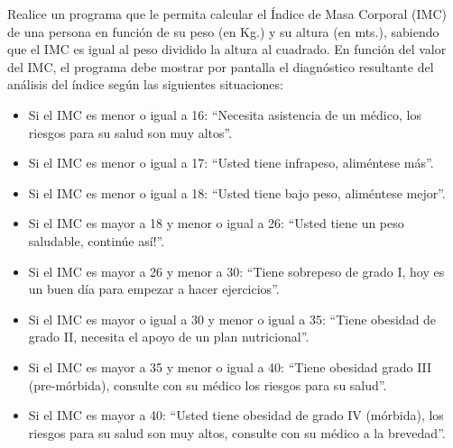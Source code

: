 Realice un programa que le permita calcular el Índice de Masa Corporal (IMC) de una persona en función de su peso (en Kg.) y su altura (en mts.), sabiendo que el IMC es igual al peso dividido la altura al cuadrado. En función del valor del IMC, el programa debe mostrar por pantalla el diagnóstico resultante del análisis del índice según las siguientes situaciones:

\begin{itemize}
	\item Si el IMC es menor o igual a 16: ``Necesita asistencia de un médico, los riesgos para su salud son muy altos''.
	\item Si el IMC es menor o igual a 17: ``Usted tiene infrapeso, aliméntese más''.
	\item Si el IMC es menor o igual a 18: ``Usted tiene bajo peso, aliméntese mejor''.
	\item Si el IMC es mayor a 18 y menor o igual a 26: ``Usted tiene un peso saludable, continúe así!''.
	\item Si el IMC es mayor a 26 y menor a 30: ``Tiene sobrepeso de grado I, hoy es un buen día para empezar a hacer ejercicios''.
	\item Si el IMC es mayor o igual a 30 y menor o igual a 35: ``Tiene obesidad de grado II, necesita el apoyo de un plan nutricional''.
	\item Si el IMC es mayor a 35 y menor o igual a 40: ``Tiene obesidad grado III (pre-mórbida), consulte con su médico los riesgos para su salud''.
	\item Si el IMC es mayor a 40: ``Usted tiene obesidad de grado IV (mórbida), los riesgos para su salud son muy altos, consulte con su médico a la brevedad''.
\end{itemize}